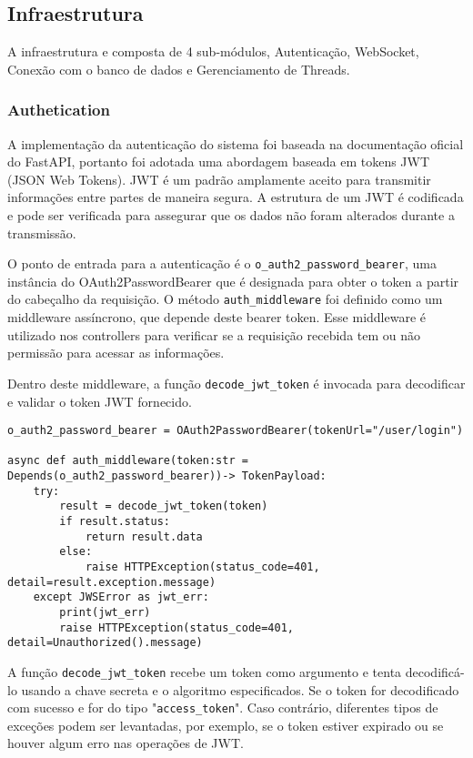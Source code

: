 \subsection{Infraestrutura}\label{subsec:infra}

A infraestrutura e composta de 4 sub-módulos, Autenticação, WebSocket, Conexão com o banco de dados e Gerenciamento de Threads.

\subsubsection{Authetication}\label{subsubsec:auth}
A implementação da autenticação do sistema foi baseada na documentação oficial do FastAPI, portanto foi adotada uma abordagem baseada em tokens JWT (JSON Web Tokens). JWT é um padrão amplamente aceito para transmitir informações entre partes de maneira segura. A estrutura de um JWT é codificada e pode ser verificada para assegurar que os dados não foram alterados durante a transmissão. 

O ponto de entrada para a autenticação é o \texttt{o\_auth2\_password\_bearer}, uma instância do OAuth2PasswordBearer que é designada para obter o token a partir do cabeçalho da requisição. O método \texttt{auth\_middleware} foi definido como um middleware assíncrono, que depende deste bearer token. Esse middleware é utilizado nos controllers para verificar se a requisição recebida tem ou não permissão para acessar as informações.


Dentro deste middleware, a função \texttt{decode\_jwt\_token} é invocada para decodificar e validar o token JWT fornecido.

\begin{verbatim}
o_auth2_password_bearer = OAuth2PasswordBearer(tokenUrl="/user/login")

async def auth_middleware(token:str = Depends(o_auth2_password_bearer))-> TokenPayload:
    try:
        result = decode_jwt_token(token)
        if result.status:
            return result.data
        else:
            raise HTTPException(status_code=401, detail=result.exception.message)
    except JWSError as jwt_err:
        print(jwt_err)
        raise HTTPException(status_code=401, detail=Unauthorized().message)
\end{verbatim}

A função \texttt{decode\_jwt\_token} recebe um token como argumento e tenta decodificá-lo usando a chave secreta e o algoritmo especificados. Se o token for decodificado com sucesso e for do tipo "\texttt{access\_token}". Caso contrário, diferentes tipos de exceções podem ser levantadas, por exemplo, se o token estiver expirado ou se houver algum erro nas operações de JWT.

